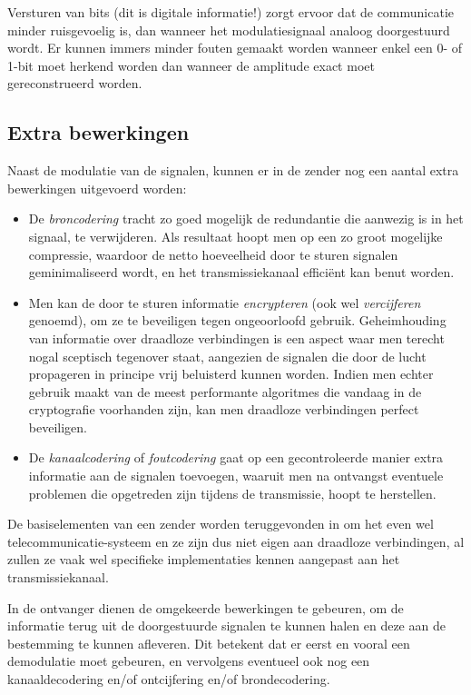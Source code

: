 {\begin{itemize}
\end{itemize}

Versturen van bits (dit is digitale informatie!) zorgt ervoor dat de communicatie minder ruisgevoelig is, dan wanneer het modulatiesignaal analoog doorgestuurd wordt. Er kunnen immers minder fouten gemaakt worden wanneer enkel een 0- of 1-bit moet herkend worden dan wanneer de amplitude exact moet gereconstrueerd worden.
}

\subsection{Extra bewerkingen}

Naast de modulatie van de signalen, kunnen er in de zender nog een aantal extra bewerkingen uitgevoerd worden:
\begin{itemize}
    \item De \emph{broncodering} tracht zo goed mogelijk de redundantie die aanwezig is in het signaal, te verwijderen. Als resultaat hoopt men op een zo groot mogelijke compressie, waardoor de netto hoeveelheid door te sturen signalen geminimaliseerd wordt, en het transmissiekanaal efficiënt kan benut worden.
    \item Men kan de door te sturen informatie \emph{encrypteren} (ook wel \emph{vercijferen} genoemd), om ze te beveiligen tegen ongeoorloofd gebruik. Geheimhouding van informatie over draadloze verbindingen is een aspect waar men terecht nogal sceptisch tegenover staat, aangezien de signalen die door de lucht propageren in principe vrij beluisterd kunnen worden. Indien men echter gebruik maakt van de meest performante algoritmes die vandaag in de cryptografie voorhanden zijn, kan men draadloze verbindingen perfect beveiligen.
    \item De \emph{kanaalcodering} of \emph{foutcodering} gaat op een gecontroleerde manier extra informatie aan de signalen toevoegen, waaruit men na ontvangst eventuele problemen die opgetreden zijn tijdens de transmissie, hoopt te herstellen.
\end{itemize}

De basiselementen van een zender worden teruggevonden in om het even wel telecommunicatie-systeem en ze zijn dus niet eigen aan draadloze verbindingen, al zullen ze vaak wel specifieke implementaties kennen aangepast aan het transmissiekanaal.

In de ontvanger dienen de omgekeerde bewerkingen te gebeuren, om de informatie terug uit de doorgestuurde signalen te kunnen halen en deze aan de bestemming te kunnen afleveren. Dit betekent dat er eerst en vooral een demodulatie moet gebeuren, en vervolgens eventueel ook nog een kanaaldecodering en/of ontcijfering en/of brondecodering.

